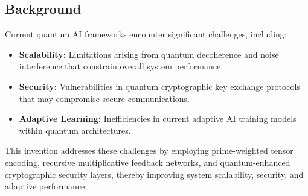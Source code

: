 \documentclass{article}
\theoremstyle{plain}
\begin{document}
\subsection{Background}
Current quantum AI frameworks encounter significant challenges, including:
\begin{itemize}
    \item \textbf{Scalability:} Limitations arising from quantum decoherence and noise interference that constrain overall system performance.
    \item \textbf{Security:} Vulnerabilities in quantum cryptographic key exchange protocols that may compromise secure communications.
    \item \textbf{Adaptive Learning:} Inefficiencies in current adaptive AI training models within quantum architectures.
\end{itemize}
This invention addresses these challenges by employing prime-weighted tensor encoding, recursive multiplicative feedback networks, and quantum-enhanced cryptographic security layers, thereby improving system scalability, security, and adaptive performance.
\end{document}
